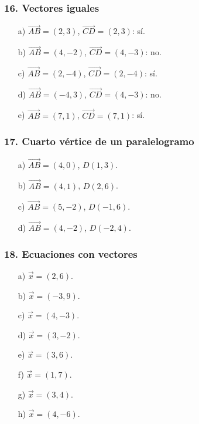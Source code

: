 \subsubsection*{16. Vectores iguales}
\begin{enumerate}
    \item[a)] $\overrightarrow{AB}=(2,3)$,
    $\overrightarrow{CD}=(2,3)$: sí.
    \item[b)] $\overrightarrow{AB}=(4,-2)$,
    $\overrightarrow{CD}=(4,-3)$: no.
    \item[c)] $\overrightarrow{AB}=(2,-4)$,
    $\overrightarrow{CD}=(2,-4)$: sí.
    \item[d)] $\overrightarrow{AB}=(-4,3)$,
    $\overrightarrow{CD}=(4,-3)$: no.
    \item[e)] $\overrightarrow{AB}=(7,1)$,
    $\overrightarrow{CD}=(7,1)$: sí.
\end{enumerate}

\subsubsection*{17. Cuarto vértice de un paralelogramo}
\begin{enumerate}
    \item[a)] $\overrightarrow{AB}=(4,0)$, $D(1,3)$.
    \item[b)] $\overrightarrow{AB}=(4,1)$, $D(2,6)$.
    \item[c)] $\overrightarrow{AB}=(5,-2)$, $D(-1,6)$.
    \item[d)] $\overrightarrow{AB}=(4,-2)$, $D(-2,4)$.
\end{enumerate}

\subsubsection*{18. Ecuaciones con vectores}
\begin{enumerate}
    \item[a)] $\vec{x}=(2,6)$.
    \item[b)] $\vec{x}=(-3,9)$.
    \item[c)] $\vec{x}=(4,-3)$.
    \item[d)] $\vec{x}=(3,-2)$.
    \item[e)] $\vec{x}=(3,6)$.
    \item[f)] $\vec{x}=(1,7)$.
    \item[g)] $\vec{x}=(3,4)$.
    \item[h)] $\vec{x}=(4,-6)$.
\end{enumerate}

